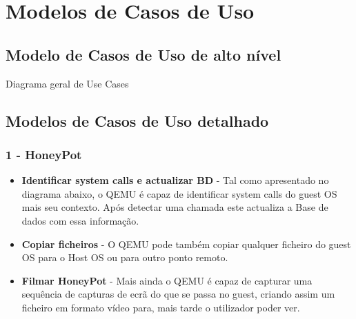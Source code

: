 \newpage
\section{Modelos de Casos de Uso}
\subsection{Modelo de Casos de Uso de alto nível}
Diagrama geral de Use Cases

\subsection{Modelos de Casos de Uso detalhado}
\subsubsection{\textbf{1 - HoneyPot}}
\begin{itemize}
 \item \textbf{Identificar system calls e actualizar BD} -  Tal como apresentado no diagrama abaixo, o QEMU é capaz de identificar system calls
 do guest OS mais seu contexto. Após detectar uma chamada este actualiza a Base de dados com essa informação. 
 \item \textbf{Copiar ficheiros} - O QEMU pode também copiar qualquer ficheiro do guest OS para o Host OS ou para outro ponto remoto.
 \item \textbf{Filmar HoneyPot} - Mais ainda o QEMU é capaz de capturar uma sequência de capturas de ecrã do que se passa no guest, 
 criando assim um ficheiro em formato vídeo para, mais tarde o utilizador poder ver.
 \end{itemize}

